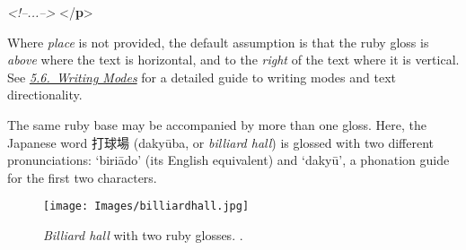 \begin{shaded}
\hspace*{1em}\mbox{}\newline 
\hspace*{1em}\mbox{}\newline 
{}\mbox{}\newline 
{}\mbox{}\newline 
\hspace*{1em}\mbox{}\newline 
\hspace*{1em}\mbox{}\newline 
{}\mbox{}\newline 
\textit{<!--{\textChinese ...}-->}\mbox{}\newline 
{</\textbf{p}>}\end{shaded}\egroup\par \noindent  Where {\itshape place} is not provided, the default assumption is that the ruby gloss is \textit{above} where the text is horizontal, and to the \textit{right} of the text where it is vertical. See \textit{\hyperref[WDWM]{5.6.\ Writing Modes}} for a detailed guide to writing modes and text directionality.\par
The same ruby base may be accompanied by more than one gloss. Here, the Japanese word {\textJapanese 打球場} (dakyūba, or  \textit{billiard hall}) is glossed with two different pronunciations: ‘biriādo’ (its English equivalent) and ‘dakyū’, a phonation guide for the first two characters. \begin{figure}[htbp]
\noindent\texttt{[image: Images/billiardhall.jpg]}
\caption{\textit{Billiard hall} with two ruby glosses. .}\end{figure}
